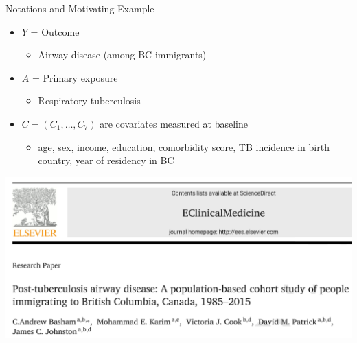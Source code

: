 \documentclass[
  ignorenonframetext,
  aspectratio=169]{beamer}
\providecommand{\tightlist}{%
  \setlength{\itemsep}{0pt}\setlength{\parskip}{0pt}}
\begin{document}
\begin{frame}{Notations and Motivating Example}
\protect\hypertarget{notations-and-motivating-example}{}
\begin{itemize}
\tightlist
\item
  \(Y\) = Outcome

  \begin{itemize}
  \tightlist
  \item
    Airway disease (among BC immigrants)
  \end{itemize}
\item
  \(A\) = Primary exposure

  \begin{itemize}
  \tightlist
  \item
    Respiratory tuberculosis
  \end{itemize}
\item
  \(C = (C_1, \ldots, C_7)\) are covariates measured at baseline

  \begin{itemize}
  \tightlist
  \item
    age, sex, income, education, comorbidity score, TB incidence in
    birth country, year of residency in BC
  \end{itemize}
\end{itemize}

\begin{center}
\includegraphics[width=0.5\linewidth]{paper.png}
\end{center}
\end{frame}
\end{document}
